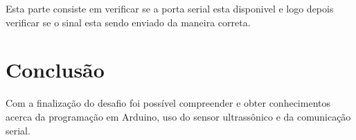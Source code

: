 \documentclass[conference]{IEEEtran}
\begin{document}
Esta parte consiste em verificar se a porta serial esta disponivel e logo depois verificar se o sinal esta sendo enviado da maneira correta.

\section{Conclusão}

Com a finalização do desafio foi possível compreender e obter conhecimentos acerca da programação em Arduino, uso do sensor ultrassônico e da comunicação serial.




\end{document}
